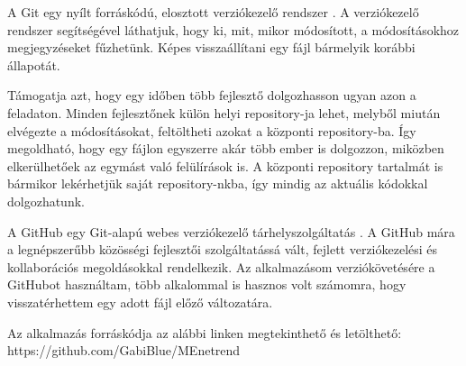 
A Git egy nyílt forráskódú, elosztott verziókezelő rendszer \cite{git}. A verziókezelő rendszer segítségével láthatjuk, hogy ki, mit, mikor módosított, a módosításokhoz megjegyzéseket fűzhetünk. Képes visszaállítani egy fájl bármelyik korábbi állapotát.

Támogatja azt, hogy egy időben több fejlesztő dolgozhasson ugyan azon a feladaton. Minden fejlesztőnek külön helyi repository-ja lehet, melyből miután elvégezte a módosításokat, feltöltheti azokat a központi repository-ba. Így megoldható, hogy egy fájlon egyszerre akár több ember is dolgozzon, miközben elkerülhetőek az egymást való felülírások is. A központi repository tartalmát is bármikor lekérhetjük saját repository-nkba, így mindig az aktuális kódokkal dolgozhatunk.


A GitHub egy Git-alapú webes verziókezelő tárhelyszolgáltatás \cite{github}. A GitHub mára a legnépszerűbb közösségi fejlesztői szolgáltatássá vált, fejlett verziókezelési és kollaborációs megoldásokkal rendelkezik. Az alkalmazásom verziókövetésére a GitHubot használtam, több alkalommal is hasznos volt számomra, hogy visszatérhettem egy adott fájl előző változatára.

Az alkalmazás forráskódja az alábbi linken megtekinthető és letölthető: https://github.com/GabiBlue/MEnetrend
